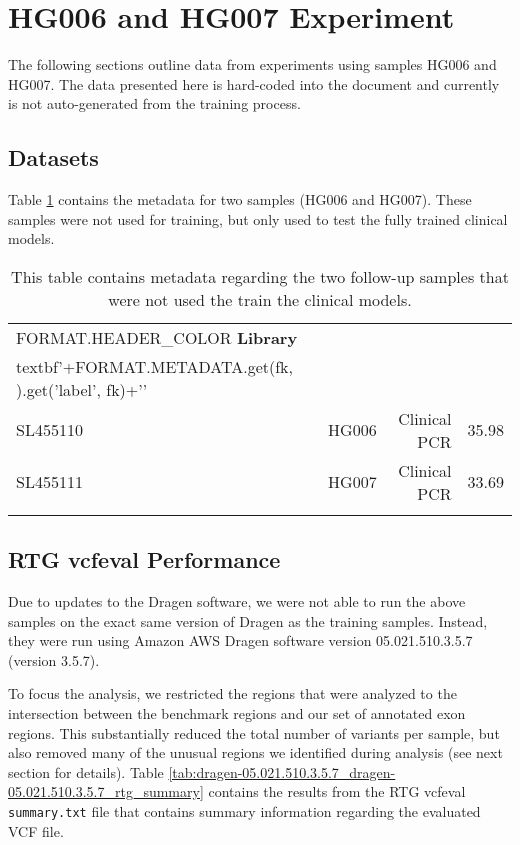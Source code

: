 \section{HG006 and HG007 Experiment}
The following sections outline data from experiments using samples HG006 and HG007.
The data presented here is hard-coded into the document and currently is not auto-generated from the training process.

\subsection{Datasets}
Table \ref{tab:sample_hardcoded_metadata} contains the metadata for two samples (HG006 and HG007).
These samples were not used for training, but only used to test the fully trained clinical models.

\begin{longtable}{|l|r|r|r|}
    \hline
    {{ FORMAT.HEADER_COLOR }}\textbf{Library}
    {%
        &{{ '\\textbf{'+FORMAT.METADATA.get(fk, {}).get('label', fk)+'}' }}
    {%
    \\ \hline
    \endhead
    SL455110&HG006&Clinical PCR&35.98 \\ \hline
    SL455111&HG007&Clinical PCR&33.69 \\ \hline
    \caption{This table contains metadata regarding the two follow-up samples that were not used the train the clinical models.}
    \label{tab:sample_hardcoded_metadata}
\end{longtable}

\subsection{RTG vcfeval Performance}
Due to updates to the Dragen software, we were not able to run the above samples on the exact same version of Dragen as the training samples.
Instead, they were run using Amazon AWS Dragen software version 05.021.510.3.5.7 (version 3.5.7).

To focus the analysis, we restricted the regions that were analyzed to the intersection between 
the benchmark regions and our set of annotated exon regions.  
This substantially reduced the total number of variants per sample, but also removed many of the unusual regions we identified during analysis (see next section for details).
Table \ref{tab:dragen-05.021.510.3.5.7_dragen-05.021.510.3.5.7_rtg_summary} contains the results from the RTG vcfeval \texttt{summary.txt} file that contains summary information regarding the evaluated VCF file. 

